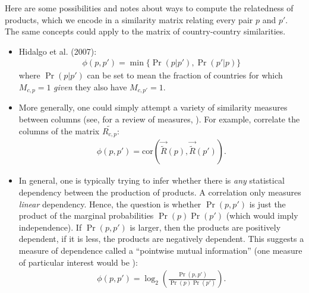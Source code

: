 \documentclass[12pt]{article}
\begin{document}
Here are some possibilities and notes about ways to compute the relatedness of products, which we encode in a similarity matrix relating every pair $p$ and $p'$. The same concepts could apply to the matrix of country-country similarities.
\begin{itemize}
	\item Hidalgo et al. (2007):
	\begin{align}
		\phi(p, p') = \min\{ \Pr(p|p'), \Pr(p'|p) \}
	\end{align}
	where $\Pr(p|p')$ can be set to mean the fraction of countries for which $M_{c,p}=1$ \emph{given} they also have $M_{c,p'}=1$.
	
	\item More generally, one could simply attempt a variety of similarity measures between columns (see, for a review of measures, \citealp{cha2007comprehensive}). For example, correlate the columns of the matrix $\widetilde{R_{c,p}}$:
	\begin{align}
		\phi(p, p') = \mathrm{cor}( \vec{\widetilde{R}}(p), \vec{\widetilde{R}}(p') ).
	\end{align}
	
	\item In general, one is typically trying to infer whether there is \emph{any} statistical dependency between the production of products. A correlation only measures \emph{linear} dependency. Hence, the question is whether $\Pr(p,p')$ is just the product of the marginal probabilities $\Pr(p)\Pr(p')$ (which would imply independence). If $\Pr(p,p')$ is larger, then the products are positively dependent, if it is less, the products are negatively dependent. This suggests a measure of dependence called a ``pointwise mutual information'' (one measure of particular interest would be \citealp{reshef2011detecting}):
	\begin{align}
		\phi(p, p') = \log_2\left(\frac{\Pr(p,p')}{\Pr(p)\Pr(p')}\right).
	\end{align}
	
\end{itemize}
\end{document}
